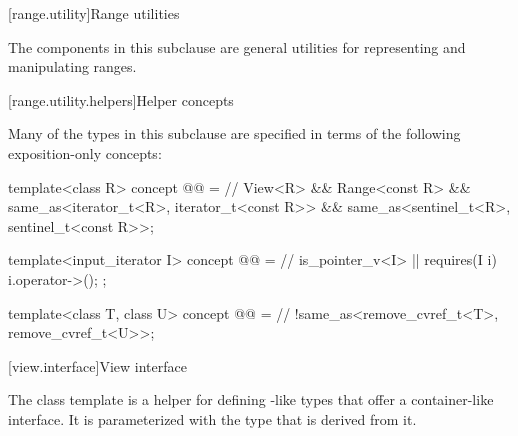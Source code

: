[range.utility]{Range utilities}

\pnum
The components in this subclause are general utilities for representing and
manipulating ranges.

[range.utility.helpers]{Helper concepts}

\pnum
Many of the types in this subclause are specified in terms of
the following exposition-only concepts:

\begin{codeblock}
template<class R>
  concept @@ =                         // \expos
    View<R> && Range<const R> &&
    same_as<iterator_t<R>, iterator_t<const R>> &&
    same_as<sentinel_t<R>, sentinel_t<const R>>;

template<input_iterator I>
  concept @@ =                           // \expos
    is_pointer_v<I> || requires(I i) { i.operator->(); };

template<class T, class U>
  concept @@ =                         // \expos
    !same_as<remove_cvref_t<T>, remove_cvref_t<U>>;
\end{codeblock}

[view.interface]{View interface}

\pnum
The class template  is a helper for defining
-like types that offer a container-like interface. It is
parameterized with the type that is derived from it.

